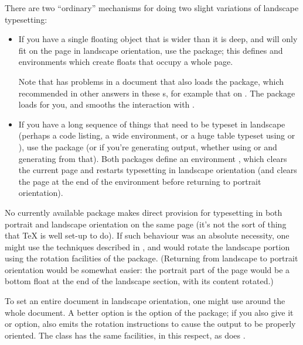 There are two ``ordinary'' mechanisms for doing two slight variations
of landscape typesetting:
\begin{itemize}
\item If you have a single floating object that is wider than it is
  deep, and will only fit on the page in landscape orientation, use
  the  package; this defines
   and 
  environments which create floats that occupy a whole page.

  Note that  has problems in a document that also
  loads the  package, which recommended in other
  answers in these s, for example that on
  .  The  package
  loads  for you, and smooths the interaction with
  .
\item If you have a long sequence of things that need to be typeset in
  landscape (perhaps a code listing, a wide 
  environment, or a huge table typeset using  or
  ), use the  package (or
   if you're generating  output, whether
  using \PDFLaTeX{} or  and generating  from
  that).  Both packages define an environment , which
  clears the current page and restarts typesetting in landscape
  orientation (and clears the page at the end of the environment
  before returning to portrait orientation).
\end{itemize}
No currently available package makes direct provision for typesetting
in both portrait and landscape orientation on the same page (it's not
the sort of thing that \TeX{} is well set-up to do).  If such
behaviour was an absolute necessity, one might use the techniques
described in
, and would
rotate the landscape portion using the rotation facilities of the
 package.  (Returning from landscape to portrait
orientation would be somewhat easier: the portrait part of the page
would be a bottom float at the end of the landscape section, with its
content rotated.)

To set an entire document in landscape orientation, one might use
 around the whole document.  A better option is the
 option of the  package; if you
also give it  or  option,
 also emits the rotation instructions to cause the
output to be properly oriented.  The  class has the same
facilities, in this respect, as does .

